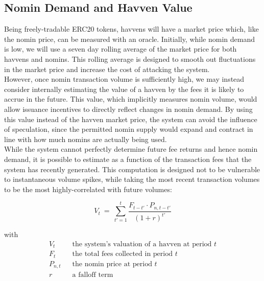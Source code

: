 \subsection{Nomin Demand and Havven Value}

\noindent Being freely-tradable ERC20 tokens, havvens will have a market
price which, like the nomin price, can be measured with an oracle. Initially,
while nomin demand is low, we will use a seven day rolling average of the
market price for both havvens and nomins. This rolling average is designed to
smooth out fluctuations in the market price and increase the cost of
attacking the system.\\

\noindent However, once nomin transaction volume is sufficiently high, we may
instead consider internally estimating the value of a havven by the fees it
is likely to accrue in the future. This value, which implicitly measures
nomin volume, would allow issuance incentives to directly reflect changes in
nomin demand. By using this value instead of the havven market price, the
system can avoid the influence of speculation, since the permitted nomin
supply would expand and contract in line with how much nomins are actually
being used. \\

\noindent While the system cannot perfectly determine future fee returns and
hence nomin demand, it is possible to estimate as a function of the
transaction fees that the system has recently generated. This computation is
designed not to be vulnerable to instantaneous volume spikes, while taking
the most recent transaction volumes to be the most highly-correlated with
future volumes:
\vspace{3mm}

\begin{equation}
    V_{t} \ = \ \sum_{t'=1}^{t} \frac{F_{t - t'} \cdot P_{n,t - t'}}{{(1 + r)}^{t'}} \label{eq:price}
\end{equation}

with
\begin{align*} 
V_{t} \ \ & \text{ the system's valuation of a havven at period } t  \\
F_t \ \ & \text{ the total fees collected in period } t\\
P_{n,t} \ \ & \text{ the nomin price at period } t\\
r \ \ & \text{ a falloff term}  \\
\end{align*}

